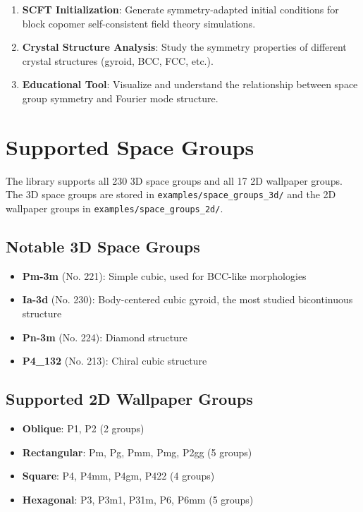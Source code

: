 \begin{enumerate}
    \item \textbf{SCFT Initialization}: Generate symmetry-adapted initial conditions for block copomer self-consistent field theory simulations.
    \item \textbf{Crystal Structure Analysis}: Study the symmetry properties of different crystal structures (gyroid, BCC, FCC, etc.).
    \item \textbf{Educational Tool}: Visualize and understand the relationship between space group symmetry and Fourier mode structure.
\end{enumerate}

\section{Supported Space Groups}

The library supports all 230 3D space groups and all 17 2D wallpaper groups. The 3D space groups are stored in \texttt{examples/space\_groups\_3d/} and the 2D wallpaper groups in \texttt{examples/space\_groups\_2d/}.

\subsection{Notable 3D Space Groups}

\begin{itemize}
    \item \textbf{Pm-3m} (No. 221): Simple cubic, used for BCC-like morphologies
    \item \textbf{Ia-3d} (No. 230): Body-centered cubic gyroid, the most studied bicontinuous structure
    \item \textbf{Pn-3m} (No. 224): Diamond structure
    \item \textbf{P4\_132} (No. 213): Chiral cubic structure
\end{itemize}

\subsection{Supported 2D Wallpaper Groups}

\begin{itemize}
    \item \textbf{Oblique}: P1, P2 (2 groups)
    \item \textbf{Rectangular}: Pm, Pg, Pmm, Pmg, P2gg (5 groups)
    \item \textbf{Square}: P4, P4mm, P4gm, P422 (4 groups)
    \item \textbf{Hexagonal}: P3, P3m1, P31m, P6, P6mm (5 groups)
\end{itemize}

